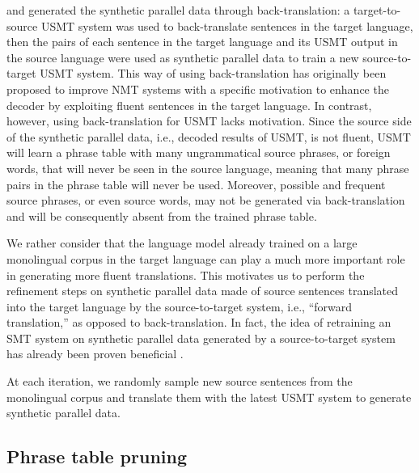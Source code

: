 \documentclass[11pt,a4paper]{article}
\begin{document}
\citet{artetxe2018unsupervised} and \citet{DBLP:journals/corr/abs-1804-07755} generated the synthetic parallel data through back-translation: a target-to-source USMT system was used to back-translate sentences in the target language, then the pairs of each sentence in the target language and its USMT output in the source language were used as synthetic parallel data to train a new source-to-target USMT system. This way of using back-translation has originally been proposed to improve NMT systems \citep{sennrich-haddow-birch:2016:P16-11} with a specific motivation to enhance the decoder by exploiting fluent sentences in the target language. In contrast, however, using back-translation for USMT lacks motivation. Since the source side of the synthetic parallel data, i.e., decoded results of USMT, is not fluent, USMT will learn a phrase table with many ungrammatical source phrases, or foreign words, that will never be seen in the source language, meaning that many phrase pairs in the phrase table will never be used. Moreover, possible and frequent source phrases, or even source words, may not be generated via back-translation and will be consequently absent from the trained phrase table.

We rather consider that the language model already trained on a large monolingual corpus in the target language can play a much more important role in generating more fluent translations.
This motivates us to perform the refinement steps on synthetic parallel data made of source sentences translated into the target language by the source-to-target system, i.e., ``forward translation,'' as opposed to back-translation. In fact, the idea of retraining an SMT system on synthetic parallel data generated by a source-to-target system has already been proven beneficial \citep{P07-1004}. 

At each iteration, we randomly sample new  source sentences from the monolingual corpus and translate them with the latest USMT system to generate synthetic parallel data.




\subsection{Phrase table pruning}
\label{section:pruning}
\end{document}
